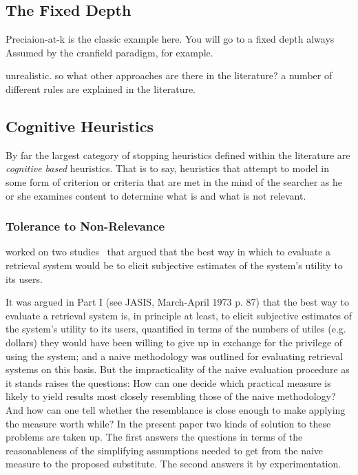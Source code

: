 \subsection{The Fixed Depth}
Preciaion-at-k is the classic example here.
You will go to a fixed depth always
Assumed by the cranfield paradigm, for example.

unrealistic. so what other approaches are there in the literature?
a number of different rules are explained in the literature.

\subsection{Cognitive Heuristics}
By far the largest category of stopping heuristics defined within the literature are \emph{cognitive based} heuristics. That is to say, heuristics that attempt to model in some form of criterion or criteria that are met in the mind of the searcher as he or she examines content to determine what is and what is not relevant.

\subsubsection{Tolerance to Non-Relevance}



\citeauthor{cooper1973retrieval_effectiveness} worked on two studies~\citep{cooper1973retrieval_effectiveness, cooper1973retrieval_effectiveness_ii} that argued that the best way in which to evaluate a retrieval system would be to elicit subjective estimates of the system's utility to its users.



It was argued in Part I (see JASIS, March-April 1973 p. 87) that the best way to evaluate a retrieval system is, in principle at least, to elicit subjective estimates of the system's utility to its users, quantified in terms of the numbers of utiles (e.g. dollars) they would have been willing to give up in exchange for the privilege of using the system; and a naive methodology was outlined for evaluating retrieval systems on this basis. But the impracticality of the naive evaluation procedure as it stands raises the questions: How can one decide which practical measure is likely to yield results most closely resembling those of the naive methodology? And how can one tell whether the resemblance is close enough to make applying the measure worth while? In the present paper two kinds of solution to these problems are taken up. The first answers the questions in terms of the reasonableness of the simplifying assumptions needed to get from the naive measure to the proposed substitute. The second answers it by experimentation.


